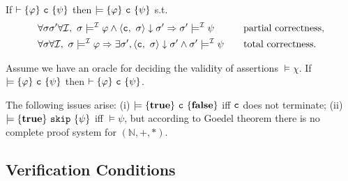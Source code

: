 
\begin{theorem}[Soundness] If $\vdash  \{\varphi\} ~\mathtt{c}~ \{\psi\}$ then $ \models \{\varphi\}  ~\mathtt{c}~  \{\psi\}$ s.t.
\begin{align*}
     &\forall \sigma\sigma'  \forall \mathcal{I}, ~ \sigma \models^{\mathcal{I}} \varphi \land \langle \mathtt{c},~\sigma \rangle \downarrow \sigma' \Rightarrow \sigma' \models^{\mathcal{I}} \psi    \quad &&\text{partial correctness,} \\
     & \forall \sigma \forall \mathcal{I}, ~ \sigma \models^{\mathcal{I}}\varphi \Rightarrow \exists \sigma', \langle \mathtt{c},~\sigma \rangle \downarrow\sigma' \land \sigma'\models^{\mathcal{I}} \psi   \quad &&\text{total correctness}.  
\end{align*}
\end{theorem}


\begin{theorem} Assume we have an oracle for deciding the validity of assertions $\models \chi$. If $\models \{\varphi\} ~\mathtt{c}~ \{\psi\}$ then $\vdash \{\varphi\} ~\mathtt{c}~ \{\psi\}$.
    \label{thm:relative-completeness}
\end{theorem}

\begin{remark}
    The following issues arise: (i) $\models \{\mathbf{true}\} ~\mathtt{c}~ \{\mathbf{false}\}$ iff $\mathtt{c}$ does not terminate; (ii) $\models \{\mathbf{true}\} ~\mathtt{\mathtt{skip}}~ \{\psi\}$ iff $\models \psi$, but according to Goedel theorem there is no complete proof system for $(\mathbb{N}, +, *)$.
\end{remark}


\subsection{Verification Conditions}


